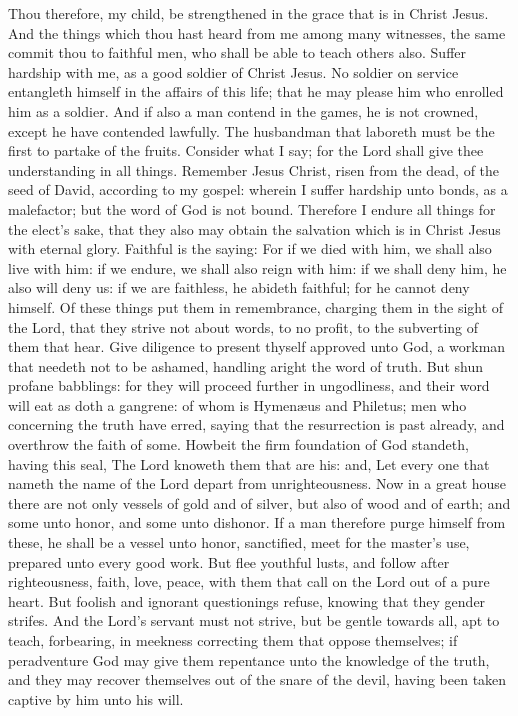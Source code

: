 Thou therefore, my child, be strengthened in the grace that is in Christ Jesus. And the things which thou hast heard from me among many witnesses, the same commit thou to faithful men, who shall be able to teach others also. Suffer hardship with me, as a good soldier of Christ Jesus. No soldier on service entangleth himself in the affairs of this life; that he may please him who enrolled him as a soldier. And if also a man contend in the games, he is not crowned, except he have contended lawfully. The husbandman that laboreth must be the first to partake of the fruits. Consider what I say; for the Lord shall give thee understanding in all things. Remember Jesus Christ, risen from the dead, of the seed of David, according to my gospel: wherein I suffer hardship unto bonds, as a malefactor; but the word of God is not bound. Therefore I endure all things for the elect’s sake, that they also may obtain the salvation which is in Christ Jesus with eternal glory. Faithful is the saying: For if we died with him, we shall also live with him: if we endure, we shall also reign with him: if we shall deny him, he also will deny us: if we are faithless, he abideth faithful; for he cannot deny himself.  Of these things put them in remembrance, charging them in the sight of the Lord, that they strive not about words, to no profit, to the subverting of them that hear. Give diligence to present thyself approved unto God, a workman that needeth not to be ashamed, handling aright the word of truth. But shun profane babblings: for they will proceed further in ungodliness, and their word will eat as doth a gangrene: of whom is Hymenæus and Philetus; men who concerning the truth have erred, saying that the resurrection is past already, and overthrow the faith of some. Howbeit the firm foundation of God standeth, having this seal, The Lord knoweth them that are his: and, Let every one that nameth the name of the Lord depart from unrighteousness. Now in a great house there are not only vessels of gold and of silver, but also of wood and of earth; and some unto honor, and some unto dishonor. If a man therefore purge himself from these, he shall be a vessel unto honor, sanctified, meet for the master’s use, prepared unto every good work. But flee youthful lusts, and follow after righteousness, faith, love, peace, with them that call on the Lord out of a pure heart. But foolish and ignorant questionings refuse, knowing that they gender strifes. And the Lord’s servant must not strive, but be gentle towards all, apt to teach, forbearing, in meekness correcting them that oppose themselves; if peradventure God may give them repentance unto the knowledge of the truth, and they may recover themselves out of the snare of the devil, having been taken captive by him unto his will. 

